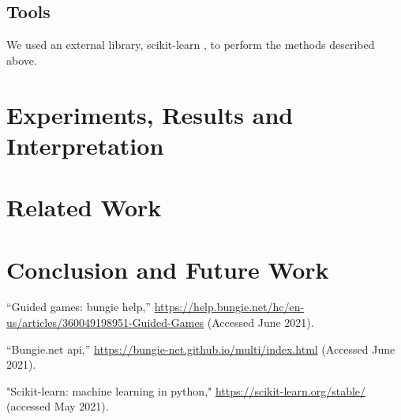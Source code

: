 \documentclass[conference]{IEEEtran}
\begin{document}
\subsection{Tools}
We used an external library, scikit-learn \cite{sklearn}, to perform
the methods described above.

\section{Experiments, Results and Interpretation}\label{RI}

\section{Related Work}\label{RW}

\section{Conclusion and Future Work}\label{CFW}


\begin{thebibliography}{00}
     ``Guided games: bungie help,''
    \url{https://help.bungie.net/hc/en-us/articles/360049198951-Guided-Games} (Accessed June 2021).

     ``Bungie.net api,'' \url{https://bungie-net.github.io/multi/index.html} (Accessed June 2021).

    "Scikit-learn: machine learning in python," \url{https://scikit-learn.org/stable/} (accessed May 2021).
\end{thebibliography}
\end{document}
